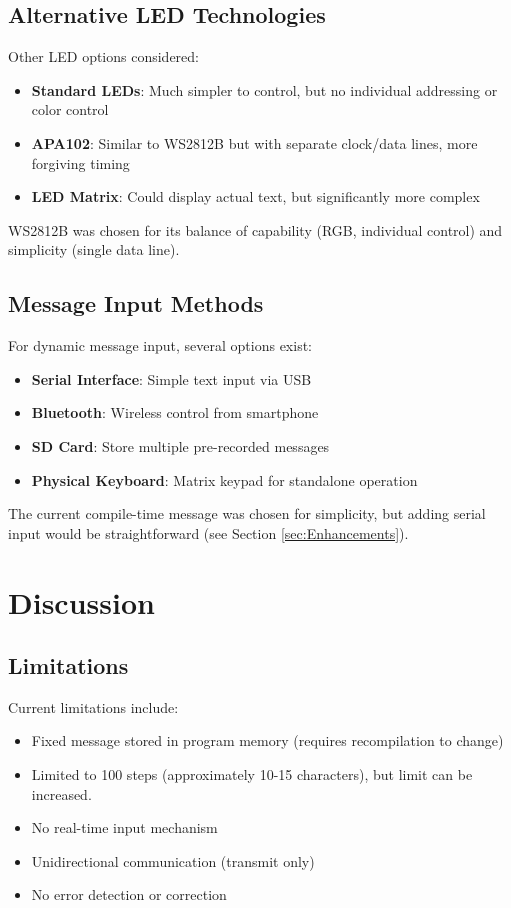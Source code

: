 \documentclass[report]{IEEEtran}
\begin{document}
\subsection{Alternative LED Technologies}
Other LED options considered:
\begin{itemize}
    \item \textbf{Standard LEDs}: Much simpler to control, but no individual addressing or color control
    \item \textbf{APA102}: Similar to WS2812B but with separate clock/data lines, more forgiving timing
    \item \textbf{LED Matrix}: Could display actual text, but significantly more complex
\end{itemize}

WS2812B was chosen for its balance of capability (RGB, individual control) and simplicity (single data line).

\subsection{Message Input Methods}
For dynamic message input, several options exist:
\begin{itemize}
    \item \textbf{Serial Interface}: Simple text input via USB
    \item \textbf{Bluetooth}: Wireless control from smartphone
    \item \textbf{SD Card}: Store multiple pre-recorded messages
    \item \textbf{Physical Keyboard}: Matrix keypad for standalone operation
\end{itemize}

The current compile-time message was chosen for simplicity, but adding serial input would be straightforward (see Section \ref{sec:Enhancements}).

\section{Discussion}

\subsection{Limitations}
Current limitations include:
\begin{itemize}
    \item Fixed message stored in program memory (requires recompilation to change)
    \item Limited to 100 steps (approximately 10-15 characters), but limit can be increased. 
    \item No real-time input mechanism
    \item Unidirectional communication (transmit only)
    \item No error detection or correction
\end{itemize}
\end{document}
